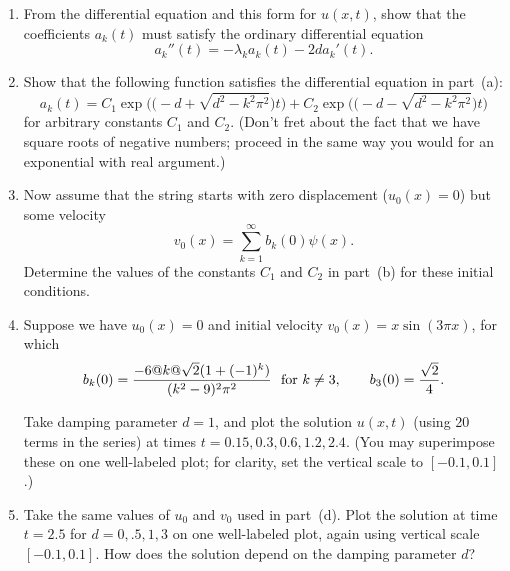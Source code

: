 \begin{enumerate}
\item From the differential equation and this form for $u(x,t)$,
      show that the coefficients $a_k(t)$ must satisfy the
      ordinary differential equation
\[ a_k''(t) = -\lambda_k a_k(t) - 2 d a_k'(t).\]

\item Show that the following function satisfies the differential equation in part~(a):
\[ a_k(t) = C_1 \exp\!\big(\big(-\!d+\sqrt{d^2-k^2\pi^2}\big)t\big)
            + C_2 \exp\!\big(\big(-\!d-\sqrt{d^2-k^2\pi^2}\big)t\big)\]
      for arbitrary constants $C_1$ and $C_2$.  (Don't fret about the fact that we
      have square roots of negative numbers; proceed in the same way you 
      would for an exponential with real argument.)

\item Now assume that the string starts with zero displacement
      ($u_0(x) = 0$) but some velocity 
     \[ v_0(x) = \sum_{k=1}^\infty b_k(0)  \psi(x).\]
      Determine the values of the constants $C_1$ and $C_2$ in part~(b)
      for these initial conditions. 

\item Suppose we have $u_0(x)=0$ and initial velocity 
      $v_0(x) = x \sin(3\pi x)$, for which
      \[ b_k(0) = {-6@k@\sqrt{2} (1+(-1)^k) \over (k^2 -9)^2 \pi^2} \mbox{\ \ for $k\ne 3$}, 
    \qquad b_3(0) = {\sqrt{2}\over 4}.\]

      Take damping parameter $d=1$, and plot the solution $u(x,t)$ 
      (using 20 terms in the series) at times $t = 0.15, 0.3, 0.6, 1.2, 2.4$.  
      (You may superimpose these on one well-labeled plot; for clarity,
      set the vertical scale to $[-0.1,0.1]$.)

\item Take the same values of $u_0$ and $v_0$ used in part~(d).
      Plot the solution at time $t=2.5$ for $d = 0, .5, 1, 3$
      on one well-labeled plot, again using vertical scale $[-0.1,0.1]$.
      How does the solution depend on the damping parameter $d$?
\end{enumerate}

